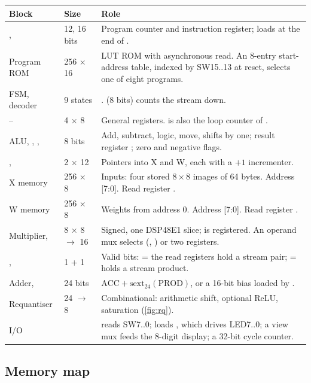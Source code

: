 \begin{center}\small
\begin{tabularx}{\linewidth}{@{}l l L@{}}
\toprule
Block & Size & Role \\
\midrule
{},  & 12, 16 bits & Program counter and instruction register;  loads at the end of . \\
Program ROM & 256 $\times$ 16 & LUT ROM with asynchronous read. An 8-entry start-address table, indexed by SW15..13 at reset, selects one of eight programs. \\
FSM, decoder & 9 states & .  (8 bits) counts the stream down. \\
-- & 4 $\times$ 8 & General registers.  is also the loop counter of . \\
ALU, , ,  & 8 bits & Add, subtract, logic, move, shifts by one; result register ; zero and negative flags. \\
,  & 2 $\times$ 12 & Pointers into X and W, each with a $+1$ incrementer. \\
X memory & 256 $\times$ 8 & Inputs: four stored 8\,$\times$\,8 images of 64 bytes. Address [7:0]. Read register . \\
W memory & 256 $\times$ 8 & Weights from address 0. Address [7:0]. Read register . \\
Multiplier,  & 8 $\times$ 8 $\to$ 16 & Signed, one DSP48E1 slice;  is registered. An operand mux selects (, ) or two registers. \\
,  & 1 + 1 & Valid bits:  = the read registers hold a stream pair;  =  holds a stream product. \\
Adder,  & 24 bits & $\mathrm{ACC} + \mathrm{sext}_{24}(\mathrm{PROD})$, or a 16-bit bias loaded by . \\
Requantiser & 24 $\to$ 8 & Combinational: arithmetic shift, optional ReLU, saturation (\cref{fig:rq}). \\
I/O & &  reads SW7..0;  loads , which drives LED7..0; a view mux feeds the 8-digit display; a 32-bit cycle counter. \\
\bottomrule
\end{tabularx}
\end{center}

\subsection{Memory map}

